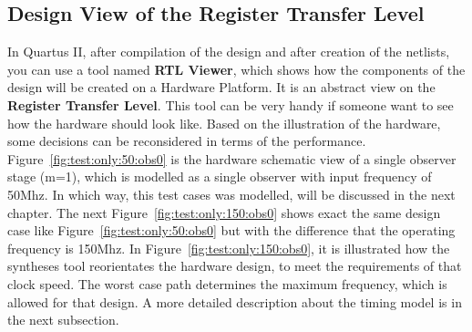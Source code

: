\subsection{Design View of the Register Transfer Level}
In Quartus II, after compilation of the design and after creation of the netlists, you can use a tool named \textbf{RTL Viewer}, which shows how
the components of the design will be created on a Hardware Platform. It is an abstract view on the \textbf{Register Transfer Level}. 
This tool can be very handy if someone want to see how the hardware should look like. Based on the illustration of the hardware, some decisions can
be reconsidered in terms of the performance. \newline
Figure~\ref{fig:test:only:50:obs0} is the hardware schematic view of a single observer stage (m=1), which is modelled as a single observer with input frequency of 50Mhz. 
In which way, this test cases was modelled, will be discussed in the next chapter. 
The next Figure~\ref{fig:test:only:150:obs0} shows exact the same design case like Figure~\ref{fig:test:only:50:obs0} but with the difference that the operating frequency is 150Mhz. 
In Figure~\ref{fig:test:only:150:obs0}, it is illustrated how the syntheses tool reorientates the hardware design, 
to meet the requirements of that clock speed. The worst case path determines the maximum frequency, which is allowed for that design. 
A more detailed description about the timing model is in the next subsection. 
